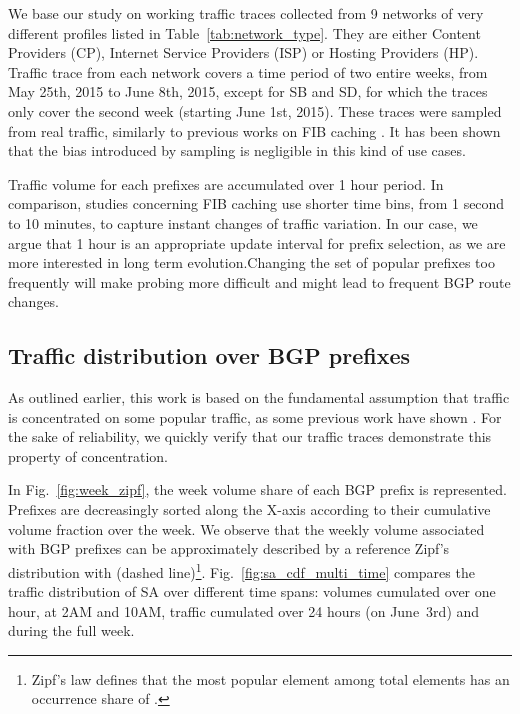 \documentclass[10pt, conference,letterpaper]{IEEEtran}
\begin{document}
We base our study on working traffic traces collected from 9 networks of very different profiles listed in Table~\ref{tab:network_type}. 
They are either Content Providers (CP), Internet Service Providers (ISP) or Hosting Providers (HP). 
Traffic trace from each network covers a time period of two entire weeks, from May 25th, 2015 to June 8th, 2015, except for SB and SD, for which the traces only cover the second week (starting  June 1st, 2015).
These traces were sampled from real traffic, similarly to previous works on FIB caching \cite{Kim2009, Zhang2012}.
It has been shown that the bias introduced by sampling is negligible in this kind of use cases.



Traffic volume  for each prefixes are accumulated over 1 hour period.
In comparison, studies concerning FIB caching \cite{Sarrar2012, Zhang2012} use shorter time bins, from 1 second to 10 minutes, to capture instant changes of traffic variation.
In our case, we argue that 1 hour is an appropriate update interval for prefix selection, as we are more interested in long term evolution.Changing the set of popular prefixes too frequently will make probing more difficult and might lead to frequent BGP route changes. 


\subsection{Traffic distribution over BGP prefixes}
\label{sec:dis}
As outlined earlier, this work is based on the fundamental assumption that traffic is concentrated on some popular traffic, as some previous work have shown \cite{Fang1999,Feamster2003, Wallerich2006}. For the sake of reliability, we quickly verify that our traffic traces demonstrate this property of concentration. 

In Fig.~\ref{fig:week_zipf}, the week volume share of each BGP prefix is represented. Prefixes are decreasingly sorted along the X-axis according to their cumulative volume fraction over the week.
We observe that the weekly volume associated with BGP prefixes can be approximately described by a reference Zipf's distribution with  (dashed line)\footnote{Zipf's law defines that the  most popular element among total  elements has an occurrence share of .}. 
Fig.~\ref{fig:sa_cdf_multi_time} compares the traffic distribution of SA over different time spans: volumes cumulated over one hour, at 2AM and 10AM, traffic cumulated over 24 hours (on June~3rd) and during the full week.
\end{document}
